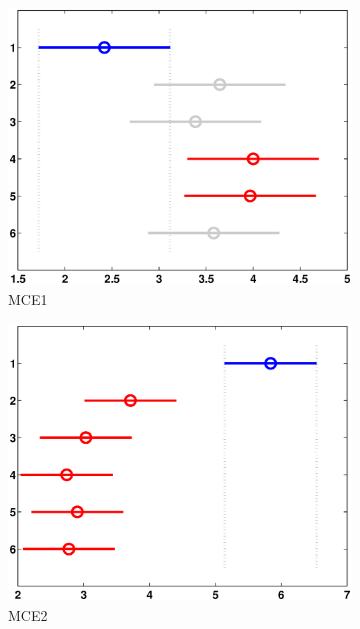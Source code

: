 \begin{figure}
	\centering
	\captionsetup{width=.85\linewidth}
	\begin{subfigure}[b]{0.49\linewidth}
		\includegraphics[width=\linewidth]{Figures/C-Bonferroni_HNMED_VS_ED1}
		\caption{MCE1} \label{fig:Bon_M1} 
	\end{subfigure}
	\begin{subfigure}[b]{0.49\linewidth}
		\includegraphics[width=\textwidth]{Figures/C-Bonferroni_HNMED_VS_ED2}
		\caption{MCE2} \label{fig:Bon_M2} 
	\end{subfigure}
	\begin{subfigure}[b]{0.49\linewidth}

\end{subfigure}
\end{figure}
